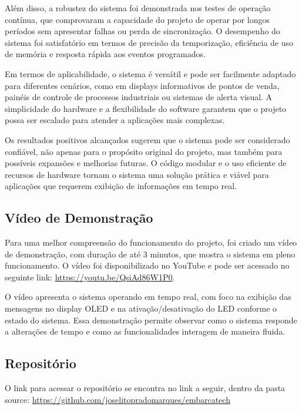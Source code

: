 \documentclass{article}
\begin{document}
Além disso, a robustez do sistema foi demonstrada nos testes de operação contínua, que comprovaram a capacidade do projeto de operar por longos períodos sem apresentar falhas ou perda de sincronização. O desempenho do sistema foi satisfatório em termos de precisão da temporização, eficiência de uso de memória e resposta rápida aos eventos programados.

Em termos de aplicabilidade, o sistema é versátil e pode ser facilmente adaptado para diferentes cenários, como em displays informativos de pontos de venda, painéis de controle de processos industriais ou sistemas de alerta visual. A simplicidade do hardware e a flexibilidade do software garantem que o projeto possa ser escalado para atender a aplicações mais complexas.

Os resultados positivos alcançados sugerem que o sistema pode ser considerado confiável, não apenas para o propósito original do projeto, mas também para possíveis expansões e melhorias futuras. O código modular e o uso eficiente de recursos de hardware tornam o sistema uma solução prática e viável para aplicações que requerem exibição de informações em tempo real.

\subsection{Vídeo de Demonstração}

Para uma melhor compreensão do funcionamento do projeto, foi criado um vídeo de demonstração, com duração de até 3 minutos, que mostra o sistema em pleno funcionamento. O vídeo foi disponibilizado no YouTube e pode ser acessado no seguinte link: \url{https://youtu.be/QsiAd86W1P0}.

O vídeo apresenta o sistema operando em tempo real, com foco na exibição das mensagens no display OLED e na ativação/desativação do LED conforme o estado do sistema. Essa demonstração permite observar como o sistema responde a alterações de tempo e como as funcionalidades interagem de maneira fluida.

\subsection{Repositório}

O link para acessar o repositório se encontra no link a seguir, dentro da pasta source: \url{https://github.com/joselitopradomarques/embarcatech}

\printbibliography
\end{document}

